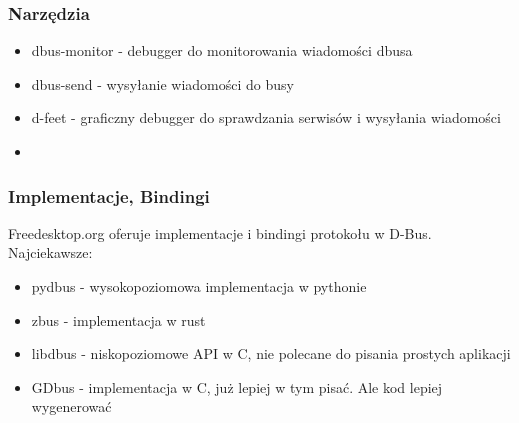 \begin{frame}
    \frametitle{Narzędzia}
    \begin{itemize}
        \item dbus-monitor - debugger do monitorowania wiadomości dbusa
        \item dbus-send - wysyłanie wiadomości do busy
        \item d-feet - graficzny debugger do sprawdzania
        serwisów i wysyłania wiadomości
        \item 
    \end{itemize}
\end{frame}

\begin{frame}
    \frametitle{Implementacje, Bindingi}
    Freedesktop.org oferuje implementacje i bindingi protokołu w D-Bus. Najciekawsze:
    \begin{itemize}
        \item pydbus - wysokopoziomowa implementacja w pythonie
        \item zbus - implementacja w rust
        \item libdbus - niskopoziomowe API w C, nie polecane do pisania 
        prostych aplikacji
        \item GDbus - implementacja w C, już lepiej w tym pisać.
        Ale kod lepiej wygenerować
    \end{itemize}
\end{frame}